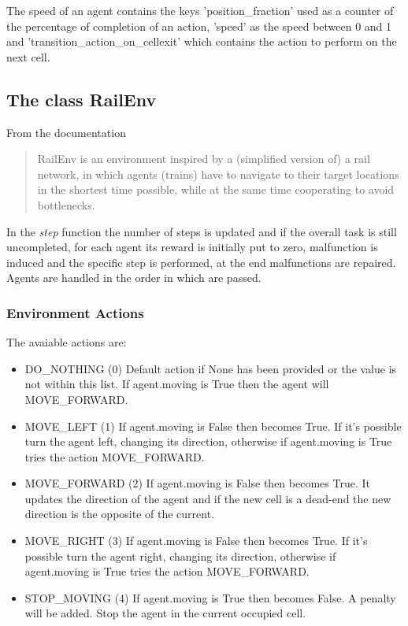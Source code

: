 \documentclass[12pt, a4paper, hidelinks]{article}
\begin{document}
The speed of an agent contains the keys 'position\_fraction' used as a counter of the percentage of completion of an action, 'speed' as the speed between 0 and 1 and 'transition\_action\_on\_cellexit' which contains the action to perform on the next cell.

\subsection{The class RailEnv}

From the documentation
\begin{quotation}
	RailEnv is an environment inspired by a (simplified version of) a rail
    network, in which agents (trains) have to navigate to their target
    locations in the shortest time possible, while at the same time cooperating
    to avoid bottlenecks.
\end{quotation}

In the \textit{step} function the number of steps is updated and if the overall task is still uncompleted, for each agent its reward is initially put to zero, malfunction is induced and the specific step is performed, at the end malfunctions are repaired.
Agents are handled in the order in which are passed.

\subsubsection*{Environment Actions}
The avaiable actions are:
\begin{itemize}
	\item DO\_NOTHING (0) Default action if None has been provided or the value is not within this list. If agent.moving is True then the agent will MOVE\_FORWARD\@.
    \item MOVE\_LEFT (1) If agent.moving is False then becomes True. If it's possible turn the agent left, changing its direction, otherwise if agent.moving is True tries the action MOVE\_FORWARD\@.
    \item MOVE\_FORWARD (2) If agent.moving is False then becomes True. It updates the direction of the agent and if the new cell is a dead-end the new direction is the opposite of the current.
    \item MOVE\_RIGHT (3) If agent.moving is False then becomes True. If it's possible turn the agent right, changing its direction, otherwise if agent.moving is True tries the action MOVE\_FORWARD\@.
    \item STOP\_MOVING (4) If agent.moving is True then becomes False. A penalty will be added. Stop the agent in the current occupied cell.
\end{itemize}
\end{document}
